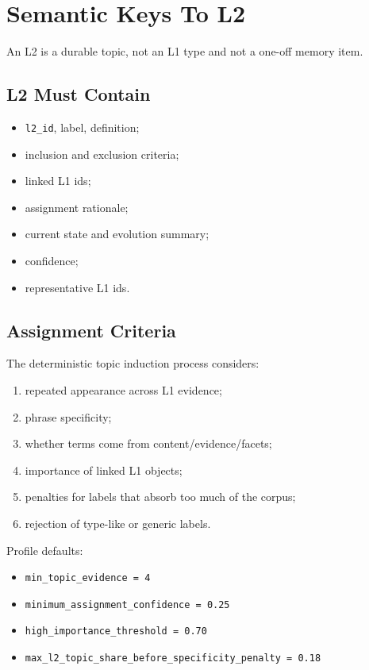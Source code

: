 \documentclass[11pt,a4paper]{article}
\newcommand{\code}[1]{{\footnotesize\texttt{#1}}}
\begin{document}
\section{Semantic Keys To L2}

An L2 is a durable topic, not an L1 type and not a one-off memory item.

\subsection{L2 Must Contain}

\begin{itemize}
  \item \code{l2\_id}, label, definition;
  \item inclusion and exclusion criteria;
  \item linked L1 ids;
  \item assignment rationale;
  \item current state and evolution summary;
  \item confidence;
  \item representative L1 ids.
\end{itemize}

\subsection{Assignment Criteria}

The deterministic topic induction process considers:

\begin{enumerate}
  \item repeated appearance across L1 evidence;
  \item phrase specificity;
  \item whether terms come from content/evidence/facets;
  \item importance of linked L1 objects;
  \item penalties for labels that absorb too much of the corpus;
  \item rejection of type-like or generic labels.
\end{enumerate}

Profile defaults:

\begin{itemize}
  \item \code{min\_topic\_evidence = 4}
  \item \code{minimum\_assignment\_confidence = 0.25}
  \item \code{high\_importance\_threshold = 0.70}
  \item \code{max\_l2\_topic\_share\_before\_specificity\_penalty = 0.18}
\end{itemize}
\end{document}
